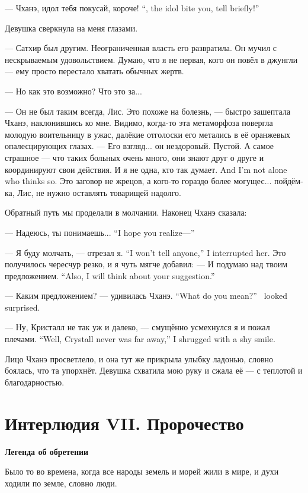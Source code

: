 {--- Чханэ, идол тебя покусай, короче!}
{``\Chhanei, the idol bite you, tell briefly!''}

Девушка сверкнула на меня глазами.

--- Сатхир был другим.
Неограниченная власть его развратила.
Он мучил с нескрываемым удовольствием.
Думаю, что я не первая, кого он повёл в джунгли --- ему просто перестало хватать обычных жертв.

--- Но как это возможно?
Что это за...

--- Он не был таким всегда, Лис.
Это похоже на болезнь, --- быстро зашептала Чханэ, наклонившись ко мне.
Видимо, когда-то эта метаморфоза повергла молодую воительницу в ужас, далёкие отголоски его метались в её оранжевых опалесцирующих глазах.
--- Его взгляд... он нездоровый.
Пустой.
А самое страшное --- что таких больных очень много, они знают друг о друге и координируют свои действия.
{И я не одна, кто так думает.}
{And I'm not alone who thinks so.}
Это заговор не жрецов, а кого-то гораздо более могущес... пойдём-ка, Лис, не нужно оставлять товарищей надолго.

Обратный путь мы проделали в молчании.
Наконец Чханэ сказала:

{--- Надеюсь, ты понимаешь...}
{``I hope you realize---''}

{--- Я буду молчать, --- отрезал я.}
{``I won't tell anyone,'' I interrupted her.}
Это получилось чересчур резко, и я чуть мягче добавил:
{--- И подумаю над твоим предложением.}
{``Also, I will think about your suggestion.''}

{--- Каким предложением? --- удивилась Чханэ.}
{``What do you mean?'' \Chhanei\ looked surprised.}

{--- Ну, Кристалл не так уж и далеко, --- смущённо усмехнулся я и пожал плечами.}
{``Well, Crystall never was far away,'' I shrugged with a shy smile.}

Лицо Чханэ просветлело, и она тут же прикрыла улыбку ладонью, словно боялась, что та упорхнёт.
Девушка схватила мою руку и сжала её --- с теплотой и благодарностью.

\chapter*{Интерлюдия VII. Пророчество}

\textbf{Легенда об обретении}

Было то во времена, когда все народы земель и морей жили в мире, и духи ходили по земле, словно люди.

